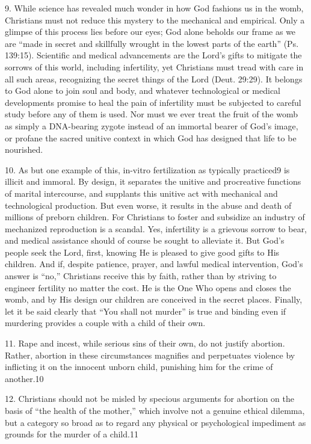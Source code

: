 \documentclass[
]{book}
\begin{document}
9. While science has revealed much wonder in how God fashions us in the womb, Christians must not reduce this mystery to the mechanical and empirical. Only a glimpse of this process lies before our eyes; God alone beholds our frame as we are ``made in secret and skillfully wrought in the lowest parts of the earth'' (Ps. 139:15). Scientific and medical advancements are the Lord's gifts to mitigate the sorrows of this world, including infertility, yet Christians must tread with care in all such areas, recognizing the secret things of the Lord (Deut. 29:29). It belongs to God alone to join soul and body, and whatever technological or medical developments promise to heal the pain of infertility must be subjected to careful study before any of them is used. Nor must we ever treat the fruit of the womb as simply a DNA-bearing zygote instead of an immortal bearer of God's image, or profane the sacred unitive context in which God has designed that life to be nourished.

10. As but one example of this, in-vitro fertilization as typically practiced9 is illicit and immoral. By design, it separates the unitive and procreative functions of marital intercourse, and supplants this unitive act with mechanical and technological production. But even worse, it results in the abuse and death of millions of preborn children. For Christians to foster and subsidize an industry of mechanized reproduction is a scandal. Yes, infertility is a grievous sorrow to bear, and medical assistance should of course be sought to alleviate it. But God's people seek the Lord, first, knowing He is pleased to give good gifts to His children. And if, despite patience, prayer, and lawful medical intervention, God's answer is ``no,'' Christians receive this by faith, rather than by striving to engineer fertility no matter the cost. He is the One Who opens and closes the womb, and by His design our children are conceived in the secret places. Finally, let it be said clearly that ``You shall not murder'' is true and binding even if murdering provides a couple with a child of their own.

11. Rape and incest, while serious sins of their own, do not justify abortion. Rather, abortion in these circumstances magnifies and perpetuates violence by inflicting it on the innocent unborn child, punishing him for the crime of another.10

12. Christians should not be misled by specious arguments for abortion on the basis of ``the health of the mother,'' which involve not a genuine ethical dilemma, but a category so broad as to regard any physical or psychological impediment as grounds for the murder of a child.11
\end{document}

